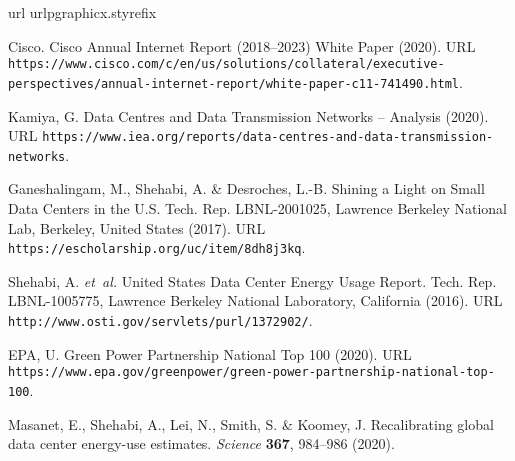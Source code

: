 \documentclass{article}
\begin{document}
%
%


\begin{thebibliography}{10}
\expandafter\ifx\csname url\endcsname\relax
  \def\url#1{\texttt{#1}}\fi
\expandafter\ifx\csname urlpgraphicx.styrefix\endcsname\relax\def\urlprefix{URL }\fi
\providecommand{\bibinfo}[2]{#2}
\providecommand{\eprint}[2][]{\url{#2}}

\bibinfo{author}{Cisco}.
\newblock \bibinfo{title}{Cisco {Annual} {Internet} {Report} (2018–2023)
  {White} {Paper}} (\bibinfo{year}{2020}).
\newblock
  \urlprefix\url{https://www.cisco.com/c/en/us/solutions/collateral/executive-perspectives/annual-internet-report/white-paper-c11-741490.html}.

\bibinfo{author}{Kamiya, G.}
\newblock \bibinfo{title}{Data {Centres} and {Data} {Transmission} {Networks}
  – {Analysis}} (\bibinfo{year}{2020}).
\newblock
  \urlprefix\url{https://www.iea.org/reports/data-centres-and-data-transmission-networks}.

\bibinfo{author}{Ganeshalingam, M.}, \bibinfo{author}{Shehabi, A.} \&
  \bibinfo{author}{Desroches, L.-B.}
\newblock \bibinfo{title}{Shining a {Light} on {Small} {Data} {Centers} in the
  {U}.{S}.}
\newblock \bibinfo{type}{Tech. Rep.} \bibinfo{number}{LBNL-2001025},
  \bibinfo{institution}{Lawrence Berkeley National Lab},
  \bibinfo{address}{Berkeley, United States} (\bibinfo{year}{2017}).
\newblock \urlprefix\url{https://escholarship.org/uc/item/8dh8j3kq}.

\bibinfo{author}{Shehabi, A.} \emph{et~al.}
\newblock \bibinfo{title}{United {States} {Data} {Center} {Energy} {Usage}
  {Report}}.
\newblock \bibinfo{type}{Tech. Rep.} \bibinfo{number}{LBNL-1005775},
  \bibinfo{institution}{Lawrence Berkeley National Laboratory},
  \bibinfo{address}{California} (\bibinfo{year}{2016}).
\newblock \urlprefix\url{http://www.osti.gov/servlets/purl/1372902/}.

\bibinfo{author}{EPA, U.}
\newblock \bibinfo{title}{Green {Power} {Partnership} {National} {Top} 100}
  (\bibinfo{year}{2020}).
\newblock
  \urlprefix\url{https://www.epa.gov/greenpower/green-power-partnership-national-top-100}.

\bibinfo{author}{Masanet, E.}, \bibinfo{author}{Shehabi, A.},
  \bibinfo{author}{Lei, N.}, \bibinfo{author}{Smith, S.} \&
  \bibinfo{author}{Koomey, J.}
\newblock \bibinfo{title}{Recalibrating global data center energy-use
  estimates}.
\newblock \emph{\bibinfo{journal}{Science}} \textbf{\bibinfo{volume}{367}},
  \bibinfo{pages}{984--986} (\bibinfo{year}{2020}).


\end{thebibliography}
\end{document}
